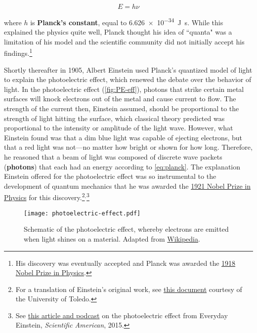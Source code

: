 \begin{equation}
	E = h\nu \label{eq:planck}
\end{equation}

\noindent where $h$ is \textbf{Planck's constant}, equal to \SI{6.626e-34}{\joule\second}. 
While this explained the physics quite well, Planck thought his idea of ``quanta" was a limitation of his model and the scientific community did not initially accept his findings.\footnote{His discovery was eventually accepted and Planck was awarded the \href{https://www.nobelprize.org/prizes/physics/1918/summary/}{1918 Nobel Prize in Physics}.}

Shortly thereafter in 1905, Albert Einstein used Planck's quantized model of light to explain the photoelectric effect, which renewed the debate over the behavior of light. 
In the photoelectric effect (\autoref{fig:PE-eff}), photons that strike certain metal surfaces will knock electrons out of the metal and cause current to flow. 
The strength of the current then, Einstein assumed, should be proportional to the strength of light hitting the surface, which classical theory predicted was proportional to the intensity or amplitude of the light wave. 
However, what Einstein found was that a dim blue light was capable of ejecting electrons, but that a red light was not---no matter how bright or shown for how long. 
Therefore, he reasoned that a beam of light was composed of discrete wave packets (\textbf{photons}) that each had an energy according to \autoref{eq:planck}. 
The explanation Einstein offered for the photoelectric effect was so instrumental to the development of quantum mechanics that he was awarded the \href{https://www.nobelprize.org/prizes/physics/1921/summary/}{1921 Nobel Prize in Physics} for this discovery.\footnote{For a translation of Einstein's original work, see \href{http://astro1.panet.utoledo.edu/~ljc/PE\_eng.pdf}{this document} courtesy of the University of Toledo.}$^,$\footnote{See \href{https://www.scientificamerican.com/article/einstein-s-legacy-the-photoelectric-effect/}{this article and podcast} on the photoelectric effect from Everyday Einstein, \emph{Scientific American}, 2015.}

\begin{figure}[!h]
	\centering
	\texttt{[image: photoelectric-effect.pdf]}
	\caption{Schematic of the photoelectric effect, whereby electrons are emitted when light shines on a material. 
	Adapted from \href{https://en.wikipedia.org/wiki/Photoelectric\_effect}{Wikipedia}.}
	\label{fig:PE-eff}
\end{figure}


